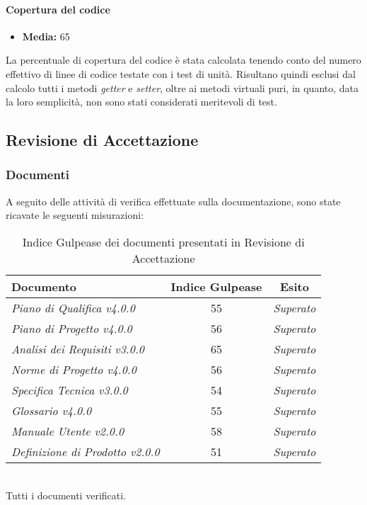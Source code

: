 \paragraph{Copertura del codice}
\begin{itemize}
\item{\textbf{Media:}} 65%
\end{itemize}
La percentuale di copertura del codice è stata calcolata tenendo conto del numero effettivo di linee di codice testate con i test di unità. Risultano quindi esclusi dal calcolo tutti i metodi \emph{getter} e \emph{setter}, oltre ai metodi virtuali puri, in quanto, data la loro semplicità, non sono stati considerati meritevoli di test.


\pagebreak

\subsection{Revisione di Accettazione}
\label{RA}
\subsubsection{Documenti}
\label{docRA}
A seguito delle attività di verifica effettuate sulla documentazione, sono state ricavate le seguenti misurazioni:
\begin{table}[!h]
\begin{center}
		\begin{tabular}{|p{5cm}|c|c|}
			\hline
			\textbf{Documento} &
			\textbf{Indice Gulpease} &
			\textbf{Esito}\\ \hline
			\textit{Piano di Qualifica v4.0.0} & 55 &  \textit{\color{green}Superato} \\ 
			\textit{Piano di Progetto v4.0.0} & 56 & \textit{\color{green}Superato} \\ 
			\textit{Analisi dei Requisiti v3.0.0} & 65 & \textit{\color{green}Superato} \\ 
			\textit{Norme di Progetto v4.0.0} & 56 & \textit{\color{green}Superato} \\ 
			\textit{Specifica Tecnica v3.0.0} & 54 & \textit{\color{green}Superato} \\ 
			\textit{Glossario v4.0.0} & 55 & \textit{\color{green}Superato} \\ 
			\textit{Manuale Utente v2.0.0}& 58 &\textit{\color{green}Superato}\\
			\textit{Definizione di Prodotto v2.0.0}& 51 &\textit{\color{green}Superato}\\
			\hline
		\end{tabular}
		\caption{Indice Gulpease dei documenti presentati in Revisione di Accettazione}
\end{center}
\end{table}
\\Tutti i documenti verificati.

